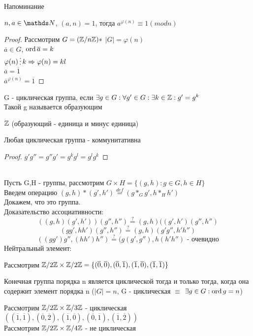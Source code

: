 \documentclass[12pt, fleqn]{article}
\begin{document}
Напоминание

\begin{consequence}
    $n,a \in \N$, $(a,n)=1$, тогда $a^{\varphi(n)} \equiv 1 (mod n)$
\end{consequence}

\begin{proof}
    Рассмотрим $G=(\mathbb{Z} / n \mathbb{Z})*$ $|G|=\varphi(n)$\\
    $\overline{a} \in G$, $\mathop{\rm ord}\nolimits \overline{a}=k$\\
    $\varphi(n) \devides k \Ra \varphi(n) = kl$\\
    $\overline{a}=\overline{1}$\\
    $\overline{a}^{\varphi(n)}=\overline{1}$
\end{proof}

\begin{definition}
    G - циклическая группа, если $\exists g \in G: \forall g' \in G: \exists k \in \mathbb{Z}: g'=g^k$\\
    Такой g называется образующим
\end{definition}

\begin{example}
    $\mathbb{Z}$ (образующий - единица и минус единица)
\end{example}

\begin{remark}
    Любая циклическая группа - коммунитативна
\end{remark}

\begin{proof}
    $g' g'' = g'' g' = g^k g^l = g^l g^k$
\end{proof}
\\
Пусть G,H - группы, рассмотрим $G \times H = \{(g,h): g\in G, h\in H\}$\\
Введем операцию $(g,h)*(g',h')\overset{def}{=}(g*_G g', h*_H h')$\\
Докажем, что это группа.\\
Доказательство ассоциативности:
\[((g,h)(g',h'))(g'',h'') \overset{?}{=} (g,h)((g',h')(g'',h'')\]
\[(g g',h h')(g'',h'') \overset{?}{=} (g,h)(g' g'', h' h'')\]
\[((g g')g'',(h h')h'') \overset{?}{=} (g(g',g''),h(h'h'') \text{ - очевидно}\]
Нейтральный элемент:

Рассмотрим $\mathbb{Z} /2 \mathbb{Z} \times \mathbb{Z} /2 \mathbb{Z} = \{(\overline{0},\overline{0}),(\overline{0},\overline{1}),(\overline{1},\overline{0}),(\overline{1},\overline{1})\}$

\begin{utv}
    Конечная группа порядка n является циклической тогда и только тогда, когда она содержит элемент порядка n ($|G|=n$, G - циклическая $\equiv$ $\exists g \in G: \mathop{\rm ord}\nolimits g = n$)
\end{utv}
Рассмотрим $\mathbb{Z} /2 \mathbb{Z} \times \mathbb{Z} /3 \mathbb{Z}$ - циклическая\\
$((\overline{1},\overline{1}), (\overline{0}, \overline{2}), (\overline{1}, \overline{0}), (\overline{0}, \overline{1}), (\overline{1},\overline{2}))$\\
Рассмотрим $\mathbb{Z} /2 \mathbb{Z} \times \mathbb{Z} /4 \mathbb{Z}$ - не циклическая
\end{document}
